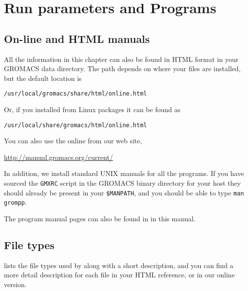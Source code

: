 %
% 
% 
% 
% 
% 
% 
% 
% 
%

\chapter{Run parameters and Programs}
\label{ch:programs}

\section{On-line and HTML manuals}
All the information in this chapter can also be found in HTML
format in your GROMACS data directory. The path depends on
where your files are installed, but the default location is \\
\centerline{\tt /usr/local/gromacs/share/html/online.html}
Or, if you installed from Linux packages it can be found as\\
\centerline{\tt /usr/local/share/gromacs/html/online.html}
You can also use the online from our web site,\\
\centerline{\href{http://manual.gromacs.org/current/}{http://manual.gromacs.org/current/}}

In addition, we install standard UNIX manuals for all the programs. If
you have sourced the {\tt GMXRC} script in the GROMACS binary directory for
your host they should already be present in your {\tt \$MANPATH}, and you
should be able to type {\eg} {\tt man grompp}.

The program manual pages can also be found in
 in this manual.

\section{File types}
\label{sec:fileformats}
 lists the file types used by {\gromacs} along with
a short description, and you can find a more detail description for
each file in your HTML reference, or in our online version.

